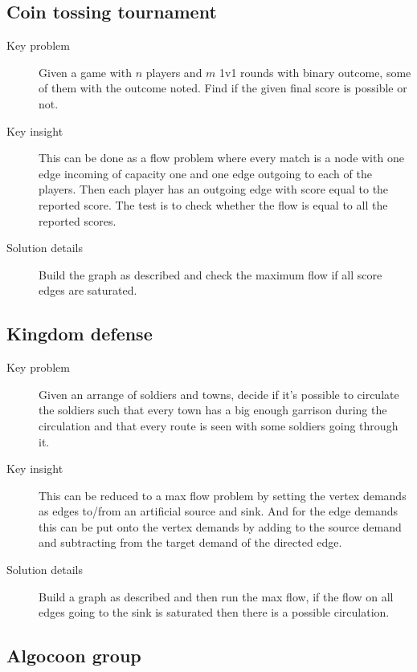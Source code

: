 \documentclass[11pt]{book}
\begin{document}
\subsection{Coin tossing tournament}

\begin{description}
	\item[Key problem] Given a game with $n$ players and $m$ 1v1 rounds with binary outcome, some of them with the outcome noted. Find if the given final score is possible or not.
	\item[Key insight] This can be done as a flow problem where every match is a node with one edge incoming of capacity one and one edge outgoing to each of the players. Then each player has an outgoing edge with score equal to the reported score. The test is to check whether the flow is equal to all the reported scores.
	\item[Solution details] Build the graph as described and check the maximum flow if all score edges are saturated.
\end{description}

\subsection{Kingdom defense}

\begin{description}
	\item[Key problem] Given an arrange of soldiers and towns, decide if it's possible to circulate the soldiers such that every town has a big enough garrison during the circulation and that every route is seen with some soldiers going through it.
	\item[Key insight] This can be reduced to a max flow problem by setting the vertex demands as edges to/from an artificial source and sink. And for the edge demands this can be put onto the vertex demands by adding to the source demand and subtracting from the target demand of the directed edge.
	\item[Solution details] Build a graph as described and then run the max flow, if the flow on all edges going to the sink is saturated then there is a possible circulation.
\end{description}

\subsection{Algocoon group}
\end{document}

